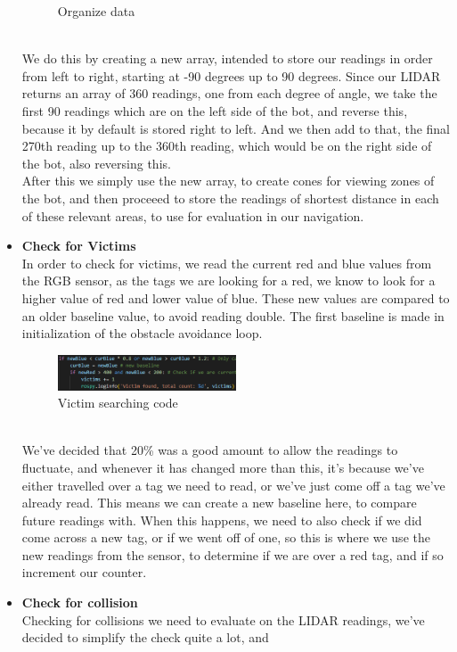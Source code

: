 \documentclass[conference]{IEEEtran}
\begin{document}
\begin{itemize}
\begin{figure}[h]
    \caption{Organize data}
\end{figure} \\
We do this by creating a new array, intended to store our readings in order from left to right, starting at -90 degrees up 
to 90 degrees. Since our LIDAR returns an array of 360 readings, one from each degree of angle, we take the first 90 
readings which are on the left side of the bot, and reverse this, because it by default is stored right to left.
And we then add to that, the final 270th reading up to the 360th reading, which would be on the right side of the bot, also 
reversing this.\\
After this we simply use the new array, to create cones for viewing zones of the bot, and then proceeed to store the readings of
shortest distance in each of these relevant areas, to use for evaluation in our navigation.\\
\item \textbf{Check for Victims}\\
In order to check for victims, we read the current red and blue values from the RGB sensor, as the tags we are looking for a red,
we know to look for a higher value of red and lower value of blue. These new values are compared to an older baseline value, 
to avoid reading double. The first baseline is made in initialization of the obstacle avoidance loop.
\begin{figure}[h] 
    \centering
    \includegraphics[width=0.5\textwidth]{victimCheck.png}
    \caption{Victim searching code}
\end{figure} \\
We've decided that 20\% was a good amount to allow the readings to fluctuate, and whenever it has changed more than this,
it's because we've either travelled over a tag we need to read, or we've just come off a tag we've already read. This means
we can create a new baseline here, to compare future readings with. When this happens, we need to also check if we did come across
a new tag, or if we went off of one, so this is where we use the new readings from the sensor, to determine if we are over a red 
tag, and if so increment our counter.\\
\item \textbf{Check for collision}\\
Checking for collisions we need to evaluate on the LIDAR readings, we've decided to simplify the check quite a lot, and

\end{itemize}
\end{document}
